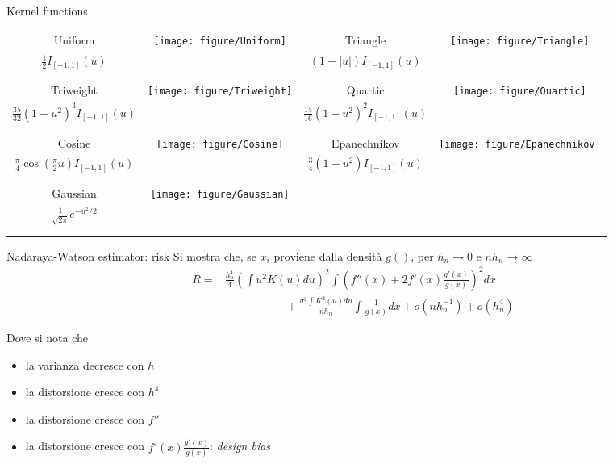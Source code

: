 \documentclass{beamer}\usepackage[]{graphicx}\usepackage[]{color}
\begin{document}
\begin{frame}{Kernel functions}

\begin{tabular}{cccc}
Uniform &
\multirow{4}{*}{
\texttt{[image: figure/Uniform]} 
}%
& 
Triangle &
\multirow{4}{*}{
\texttt{[image: figure/Triangle]} 
}%
\\
$\frac{1}{2}I_{[-1,1]}(u)$ & &  $(1-|u|)I_{[-1,1]}(u)$ & \\ & & & \\ & & & \\
Triweight &
\multirow{4}{*}{
\texttt{[image: figure/Triweight]} 
}%
& 
Quartic &
\multirow{4}{*}{
\texttt{[image: figure/Quartic]} 
}%
\\
 $\frac{35}{32}(1-u^2)^3I_{[-1,1]}(u)$ & &   $\frac{15}{16}(1-u^2)^2I_{[-1,1]}(u)$ & \\ & & & \\ & & & \\
Cosine &
\multirow{4}{*}{
\texttt{[image: figure/Cosine]} 
}%
& 
Epanechnikov &
\multirow{4}{*}{
\texttt{[image: figure/Epanechnikov]} 
}%
\\
$\frac{\pi}{4}\cos\left(\frac{\pi}{2}u\right)I_{[-1,1]}(u)$ & &    $\frac{3}{4}(1-u^2)I_{[-1,1]}(u)$  & \\ & & & \\ & & & \\
Gaussian &
\multirow{4}{*}{
\texttt{[image: figure/Gaussian]} 
}%
& 
 &
\multirow{4}{*}{}%
\\
$\frac{1}{\sqrt{2\pi}} e^{-u^2/2}$ & &      & \\ & & & \\ & & & \\

\end{tabular}
\end{frame}


\begin{frame}{Nadaraya-Watson estimator: risk}
Si mostra che, se $x_i$ proviene dalla densit\`a $g()$, per $h_n\rightarrow 0$ e $nh_n\rightarrow\infty$
\begin{align*}
R = &\frac{h_n^4}{4}\left(\int u^2K(u)du\right)^2\int \left(f''(x)+2f'(x)\frac{g'(x)}{g(x)}\right)^2dx \\
&\phantom{====}+ \frac{\sigma^2\int K^2(u)du}{nh_n}\int\frac{1}{g(x)}dx +o(nh_n^{-1}) +o(h_n^4)
\end{align*}

Dove si nota che
\begin{itemize}
\item la varianza decresce con $h$
\item la distorsione cresce con $h^4$
\item la distorsione cresce con  $f''$
\item la distorsione cresce con  $f'(x)\frac{g'(x)}{g(x)}$: {\it design bias}
\end{itemize}
\end{frame}
\end{document}
